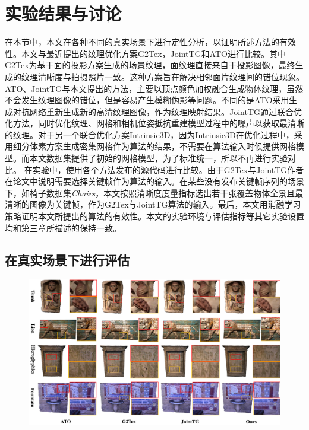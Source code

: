 \section{实验结果与讨论}
在本节中，本文在各种不同的真实场景下进行定性分析，以证明所述方法的有效性。本文与最近提出的纹理优化方案G2Tex，JointTG和ATO进行比较。其中G2Tex为基于面的投影方案生成的场景纹理，面纹理直接来自于投影图像，最终生成的纹理清晰度与拍摄照片一致。这种方案旨在解决相邻面片纹理间的错位现象。ATO、JointTG与本文提出的方法，主要以顶点颜色加权融合生成物体纹理，虽然不会发生纹理图像的错位，但是容易产生模糊伪影等问题。不同的是ATO采用生成对抗网络重新生成新的高清纹理图像，作为纹理映射结果。JointTG通过联合优化方法，同时优化纹理、网格和相机位姿抵抗重建模型过程中的噪声以获取最清晰的纹理。对于另一个联合优化方案Intrinsic3D，因为Intrinsic3D在优化过程中，采用细分体素方案生成密集网格作为算法的结果，不需要在算法输入时候提供网格模型。而本文数据集提供了初始的网格模型，为了标准统一，所以不再进行实验对比。
在实验中，使用各个方法发布的源代码进行比较。由于G2Tex与JointTG作者在论文中说明需要选择关键帧作为算法的输入。在某些没有发布关键帧序列的场景下，如椅子数据集\emph{Chairs}，本文按照清晰度度量指标选出若干张覆盖物体全景且最清晰的图像为关键帧，作为G2Tex与JointTG算法的输入。最后，本文用消融学习策略证明本文所提出的算法的有效性。本文的实验环境与评估指标等其它实验设置均和第三章所描述的保持一致。


\subsection{在真实场景下进行评估}
\begin{figure}[!t]
\centering
\includegraphics[width=1\linewidth]{pic/work2/compare3.pdf}

\label{fig:ex2_3}
\end{figure}

